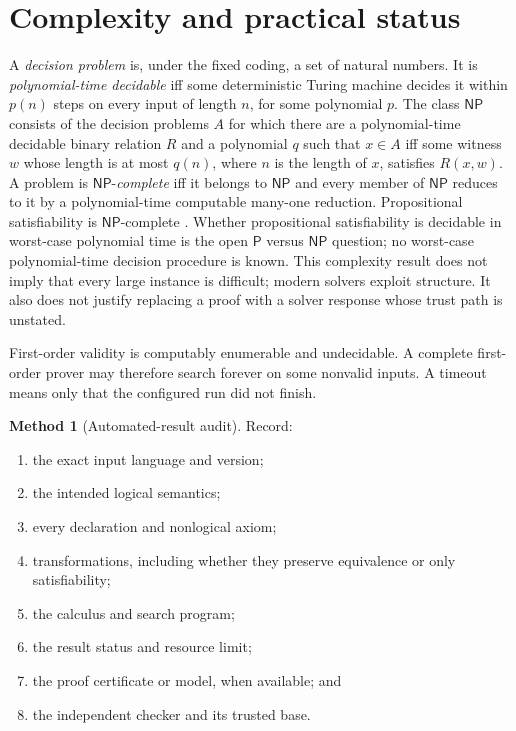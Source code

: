 \documentclass[11pt,oneside,openany]{book}
\theoremstyle{definition}
\newtheorem{method}[definition]{Method}
\theoremstyle{plain}
\theoremstyle{remark}
\newcommand{\NP}{\mathsf{NP}}
\begin{document}
\section{Complexity and practical status}
\label{sec:automated-reasoning-07}

A \emph{decision problem} is, under the fixed coding, a set of natural
numbers.  It is \emph{polynomial-time decidable} iff some deterministic
Turing machine decides it within \(p(n)\) steps on every input of length
\(n\), for some polynomial \(p\).  The class \(\NP\) consists of the
decision problems \(A\) for which there are a polynomial-time decidable
binary relation \(R\) and a polynomial \(q\) such that \(x\in A\) iff
some witness \(w\) whose length is at most \(q(n)\), where \(n\) is
the length of \(x\), satisfies \(R(x,w)\).  A problem is \(\NP\)-\emph{complete} iff
it belongs to \(\NP\) and every member of \(\NP\) reduces to it by a
polynomial-time computable many-one reduction.  Propositional
satisfiability is \(\NP\)-complete \cite{Cook1971}.  Whether
propositional satisfiability is decidable in worst-case polynomial time is
the open \(\mathsf P\) versus \(\NP\) question; no worst-case
polynomial-time decision procedure is known.  This complexity
result does not imply that every large instance is difficult; modern solvers
exploit structure.  It also does not justify replacing a proof with a solver
response whose trust path is unstated.

First-order validity is computably enumerable and undecidable.  A complete
first-order prover may therefore search forever on some nonvalid inputs.  A
timeout means only that the configured run did not finish.

\begin{method}[Automated-result audit]
Record:
\begin{enumerate}
  \item the exact input language and version;
  \item the intended logical semantics;
  \item every declaration and nonlogical axiom;
  \item transformations, including whether they preserve equivalence or only
        satisfiability;
  \item the calculus and search program;
  \item the result status and resource limit;
  \item the proof certificate or model, when available; and
  \item the independent checker and its trusted base.
\end{enumerate}
\end{method}
\end{document}

